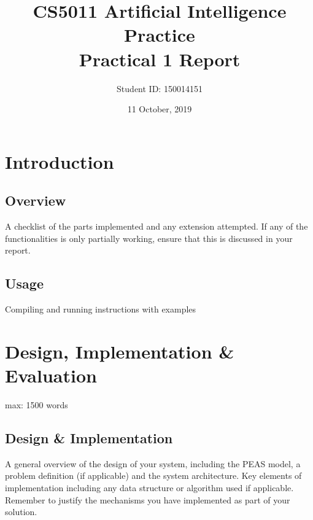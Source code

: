 \documentclass[letterpaper,12pt]{article}
\begin{document}
\title{CS5011 Artificial Intelligence Practice\\Practical 1 Report}
\author{Student ID: 150014151}
\date{11 October, 2019}
\maketitle



\section{Introduction}
\label{sec:introduction}

\subsection{Overview}

A checklist of the parts implemented and any extension attempted. If any of the functionalities is only partially working, ensure that this is discussed in your report.

\subsection{Usage}

Compiling and running instructions with examples


\section{Design, Implementation \& Evaluation}
\label{sec:design-implementation-evaluation}

max: 1500 words

\subsection{Design \& Implementation}

A general overview of the design of your system, including the PEAS model, a problem definition (if applicable) and the system architecture. Key elements of implementation including any data structure or algorithm used if applicable. Remember to justify the mechanisms you have implemented as part of your solution.\\
\end{document}
